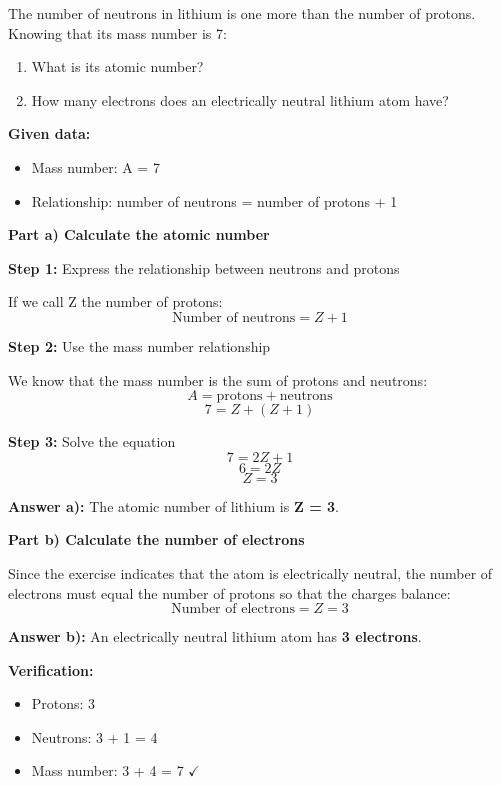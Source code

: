 \begin{exercise}
    The number of neutrons in lithium is one more than the number of protons. Knowing that its mass number is 7:
    \begin{enumerate}[label=\letraminuscula]
    \item What is its atomic number?
    \item How many electrons does an electrically neutral lithium atom have?
    \end{enumerate}
    \begin{solu}
        \textbf{Given data:}
        \begin{itemize}
            \item Mass number: A = 7
            \item Relationship: number of neutrons = number of protons + 1
        \end{itemize}

        \textbf{Part a) Calculate the atomic number}

        \textbf{Step 1:} Express the relationship between neutrons and protons

        If we call Z the number of protons:
        \[
            \text{Number of neutrons} = Z + 1
        \]

        \textbf{Step 2:} Use the mass number relationship

        We know that the mass number is the sum of protons and neutrons:
        \[
            A = \text{protons} + \text{neutrons}
        \]
        \[
            7 = Z + (Z + 1)
        \]

        \textbf{Step 3:} Solve the equation
        \[
            7 = 2Z + 1
        \]
        \[
            6 = 2Z
        \]
        \[
            Z = 3
        \]

        \textbf{Answer a):} The atomic number of lithium is \textbf{Z = 3}.

        \textbf{Part b) Calculate the number of electrons}

        Since the exercise indicates that the atom is electrically neutral, the number of electrons must equal the number of protons so that the charges balance:
        \[
            \text{Number of electrons} = Z = 3
        \]

        \textbf{Answer b):} An electrically neutral lithium atom has \textbf{3 electrons}.

        \textbf{Verification:}
        \begin{itemize}
            \item Protons: 3
            \item Neutrons: 3 + 1 = 4
            \item Mass number: 3 + 4 = 7 \( \checkmark \)
        \end{itemize}
    \end{solu}
\end{exercise}
